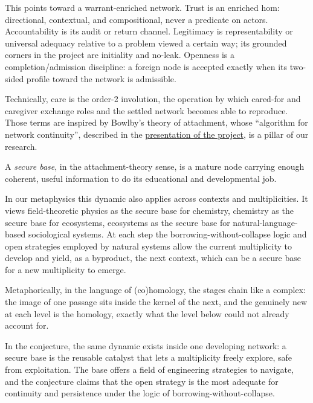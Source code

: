 \documentclass[11pt]{article}
\begin{document}
This points toward a warrant-enriched network. Trust is an enriched hom:
directional, contextual, and compositional, never a predicate on actors.
Accountability is its audit or return channel. Legitimacy is representability
or universal adequacy relative to a problem viewed a certain way; its grounded
corners in the project are initiality and no-leak. Openness is a
completion/admission discipline: a foreign node is accepted exactly when its
two-sided profile toward the network is admissible.

Technically, care is the order-2 involution, the operation by which cared-for
and caregiver exchange roles and the settled network becomes able to reproduce.
Those terms are inspired by Bowlby's theory of attachment, whose ``algorithm
for network continuity'', described in the
\href{../README.md}{presentation of the project}, is a
pillar of our research.

\begin{center}
\end{center}

A \emph{secure base}, in the attachment-theory sense, is a mature node carrying
enough coherent, useful information to do its educational and developmental
job.

In our metaphysics this dynamic also applies across contexts and
multiplicities. It views field-theoretic physics as the secure base for
chemistry, chemistry as the secure base for ecosystems, ecosystems as the
secure base for natural-language-based sociological systems. At each step the
borrowing-without-collapse logic and open strategies employed by natural
systems allow the current multiplicity to develop and yield, as a byproduct,
the next context, which can be a secure base for a new multiplicity to emerge.

Metaphorically, in the language of (co)homology, the stages chain like a
complex: the image of one passage sits inside the kernel of the next, and the
genuinely new at each level is the homology, exactly what the level below could
not already account for.

In the conjecture, the same dynamic exists inside one developing network: a
secure base is the reusable catalyst that lets a multiplicity freely explore,
safe from exploitation. The base offers a field of engineering strategies to
navigate, and the conjecture claims that the open strategy is the most adequate
for continuity and persistence under the logic of borrowing-without-collapse.
\end{document}
